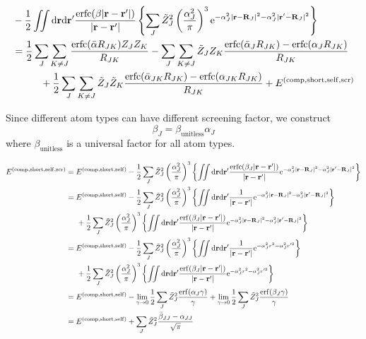 \documentclass[paper=a4, fontsize=11pt]{article} %
\numberwithin{equation}{section} %
\numberwithin{figure}{section} %
\numberwithin{table}{section} %
\newcommand{\br}{{\bf{r}}}
\newcommand{\bR}{{\bf{R}}}
\newcommand{\rself}{{\mathrm{self}}}
\newcommand{\re}{{\mathrm{e}}}
\newcommand{\rshort}{{\mathrm{short}}}
\newcommand{\rerf}{{\mathrm{erf}}}
\newcommand{\rerfc}{{\mathrm{erfc}}}
\newcommand{\rd}{{\mathrm{d}}}
\newcommand{\rcomp}{{\mathrm{comp}}}
\newcommand{\al}{{\alpha}}
\newcommand{\bal}{{\bar{\alpha}}}
\begin{document}
\begin{equation}
\begin{split}
&- \frac{1}{2}\iint \rd \br \rd \br'\frac{\rerfc(\beta|\br-\br'|)}{|\br-\br'|} \left\{ \sum_J \tilde Z_J^2\left(\frac{\al_J^2}{\pi}\right)^3\re^{-\al_J^2|\br-\bR_J|^2-\al_J^2|\br'-\bR_J|^2}\right\}\\
&= \frac{1}{2}\sum_{J} \sum_{K \neq J} \frac{\rerfc(\bal R_{JK})Z_JZ_{K}}{R_{JK}}  - \sum_J \sum_{K \neq J} \tilde Z_J Z_K \frac{\rerfc(\bal_J R_{JK}) - \rerfc(\al_J R_{JK})}{R_{JK}}  \\
&\hspace{10mm}+ \frac{1}{2}\sum_J\sum_{K \neq J} \tilde Z_J \tilde Z_K  \frac{\rerfc(\bal_{JK} R_{JK}) - \rerfc(\al_{JK} R_{JK})}{R_{JK}} + E^{(\rcomp,\rshort,\rself, \mathrm{scr})} \\
\end{split}
\end{equation}

Since different atom types can have different screening factor, we construct
\begin{equation}
\beta_J = \beta_{\mathrm{unitless}} \al_J
\end{equation}
where $\beta_{\mathrm{unitless}}$ is a universal factor for all atom types.


\begin{equation}
\begin{split}
E^{(\rcomp,\rshort,\rself, \mathrm{scr})} 
&= E^{(\rcomp,\rshort,\rself)} - \frac{1}{2}\sum_J \tilde Z_J^2  \left(\frac{\al_J^2}{\pi}\right)^3 \left\{ \iint \rd \br \rd \br' \frac{\rerfc(\beta_J|\br-\br'|)}{|\br-\br'|} \re^{-\al_J^2|\br-\bR_J|^2-\al_J^2|\br'-\bR_J|^2}\right\}\\
&= E^{(\rcomp,\rshort,\rself)} - \frac{1}{2}\sum_J \tilde Z_J^2  \left(\frac{\al_J^2}{\pi}\right)^3 \left\{ \iint \rd \br \rd \br' \frac{1}{|\br-\br'|} \re^{-\al_J^2|\br-\bR_J|^2-\al_J^2|\br'-\bR_J|^2}\right\} \\
& \hspace{5mm} +\frac{1}{2}\sum_J \tilde Z_J^2  \left(\frac{\al_J^2}{\pi}\right)^3 \left\{ \iint \rd \br \rd \br' \frac{\rerf(\beta_J|\br-\br'|)}{|\br-\br'|} \re^{-\al_J^2|\br-\bR_J|^2-\al_J^2|\br'-\bR_J|^2}\right\}\\
&= E^{(\rcomp,\rshort,\rself)} - \frac{1}{2}\sum_J \tilde Z_J^2  \left(\frac{\al_J^2}{\pi}\right)^3 \left\{ \iint \rd \br \rd \br' \frac{1}{|\br-\br'|} \re^{-\al_J^{2} r^2-\al_J^{2} r'^{2}}\right\} \\
& \hspace{5mm} +\frac{1}{2}\sum_J \tilde Z_J^2  \left(\frac{\al_J^2}{\pi}\right)^3 \left\{ \iint \rd \br \rd \br' \frac{\rerf(\beta_J|\br-\br'|)}{|\br-\br'|} \re^{-\al_J^{2} r^{2} - \al_J^{2} r'^{2}}\right\}\\
&= E^{(\rcomp,\rshort,\rself)} - \lim_{\gamma \rightarrow 0} \frac{1}{2}\sum_{J}  \tilde Z_J^2 \frac{\rerf(\al_{J}\gamma)}{\gamma} + \lim_{\gamma \rightarrow 0} \frac{1}{2} \sum_J \tilde Z_J^2 \frac{\rerf(\beta_{J}\gamma)}{\gamma} \\
&= E^{(\rcomp,\rshort,\rself)} + \sum_J \tilde Z_J ^2 \frac{\bar{\beta}_{JJ} - \al_{JJ} }{\sqrt{\pi}}
\end{split}
\end{equation}
\end{document}
